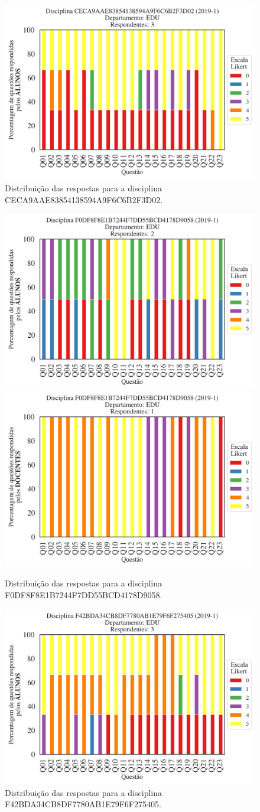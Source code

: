 \documentclass[a4paper,10pt]{article}
\begin{document}
\begin{figure}[h]
\centering
\includegraphics[width=0.485\linewidth]{analise_disciplina_departamento_EDU_ALUNO_TURMA_CECA9AAE83854138594A9F6C6B2F3D02.png}
\caption{\label{fig:analise_geral_departamento}                Distribuição das respostas para a disciplina CECA9AAE83854138594A9F6C6B2F3D02.}
\end{figure}
\begin{figure}[h]
\centering
\includegraphics[width=0.485\linewidth]{analise_disciplina_departamento_EDU_ALUNO_TURMA_F0DF8F8E1B7244F7DD55BCD4178D9058.png}
\includegraphics[width=0.485\linewidth]{analise_disciplina_departamento_EDU_DOCENTE_TURMA_F0DF8F8E1B7244F7DD55BCD4178D9058.png}
\caption{\label{fig:analise_geral_departamento}                Distribuição das respostas para a disciplina F0DF8F8E1B7244F7DD55BCD4178D9058.}
\end{figure}
\begin{figure}[h]
\centering
\includegraphics[width=0.485\linewidth]{analise_disciplina_departamento_EDU_ALUNO_TURMA_F42BDA34CB8DF7780AB1E79F6F275405.png}
\caption{\label{fig:analise_geral_departamento}                Distribuição das respostas para a disciplina F42BDA34CB8DF7780AB1E79F6F275405.}
\end{figure}
\end{document}
